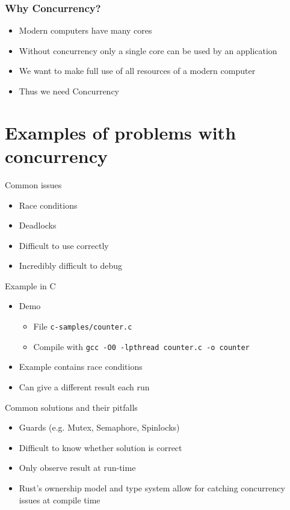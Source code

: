 \documentclass{beamer}
\begin{document}
\begin{frame}
    \frametitle{Why Concurrency?}
    \begin{itemize}
        \item Modern computers have many cores
        \item Without concurrency only a single core can be used by an application
        \item We want to make full use of all resources of a modern computer
        \item Thus we need Concurrency
    \end{itemize}
\end{frame}

\section{Examples of problems with concurrency}

\begin{frame}{Common issues}
    \begin{itemize}
        \item Race conditions
        \item Deadlocks
        \item Difficult to use correctly
        \item Incredibly difficult to debug
    \end{itemize}
\end{frame}

\begin{frame}{Example in C}
    \begin{itemize}
        \item Demo
            \begin{itemize}
                \item File \texttt{c-samples/counter.c}
                \item Compile with \texttt{gcc -O0 -lpthread counter.c -o counter}
            \end{itemize}
        \item Example contains race conditions
        \item Can give a different result each run
    \end{itemize}
\end{frame}

\begin{frame}{Common solutions and their pitfalls}
    \begin{itemize}
        \item Guards (e.g. Mutex, Semaphore, Spinlocks)
        \item Difficult to know whether solution is correct
        \item Only observe result at run-time
        \item Rust's ownership model and type system allow for catching concurrency issues at compile time
    \end{itemize}
\end{frame}
\end{document}
